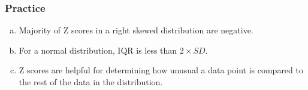 
\begin{frame}
\frametitle{Practice}


\begin{enumerate}[(a)]
\item Majority of Z scores in a right skewed distribution are negative.
\item For a normal distribution, IQR is less than $2 \times SD$.
\item Z scores are helpful for determining how unusual a data point is compared to the rest of the data in the distribution.
\end{enumerate}

\end{frame}

